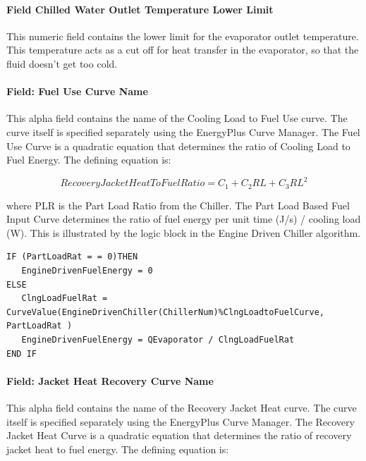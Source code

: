 \paragraph{Field Chilled Water Outlet Temperature Lower Limit}\label{field-chilled-water-outlet-temperature-lower-limit-3}

This numeric field contains the lower limit for the evaporator outlet temperature. This temperature acts as a cut off for heat transfer in the evaporator, so that the fluid doesn't get too cold.

\paragraph{Field: Fuel Use Curve Name}\label{field-fuel-use-curve-name}

This alpha field contains the name of the Cooling Load to Fuel Use curve. The curve itself is specified separately using the EnergyPlus Curve Manager. The Fuel Use Curve is a quadratic equation that determines the ratio of Cooling Load to Fuel Energy. The defining equation is:

\begin{equation}
    RecoveryJacketHeatToFuelRatio = {C_1} + {C_2}RL + {C_3}R{L^2}
\end{equation}

where PLR is the Part Load Ratio from the Chiller. The Part Load Based Fuel Input Curve determines the ratio of fuel energy per unit time (J/s) / cooling load (W). This is illustrated by the logic block in the Engine Driven Chiller algorithm.

\begin{lstlisting}
IF (PartLoadRat = = 0)THEN
   EngineDrivenFuelEnergy = 0
ELSE
   ClngLoadFuelRat = CurveValue(EngineDrivenChiller(ChillerNum)%ClngLoadtoFuelCurve, PartLoadRat )
   EngineDrivenFuelEnergy = QEvaporator / ClngLoadFuelRat
END IF
\end{lstlisting}

\paragraph{Field: Jacket Heat Recovery Curve Name}\label{field-jacket-heat-recovery-curve-name-000}

This alpha field contains the name of the Recovery Jacket Heat curve. The curve itself is specified separately using the EnergyPlus Curve Manager. The Recovery Jacket Heat Curve is a quadratic equation that determines the ratio of recovery jacket heat to fuel energy. The defining equation is:

